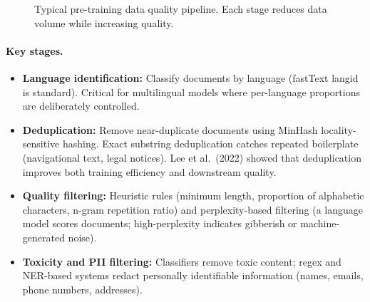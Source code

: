 \begin{figure}[H]
\centering
{}
\caption{Typical pre-training data quality pipeline.  Each stage reduces data volume
while increasing quality.}
\label{fig:data-pipeline}
\end{figure}

\paragraph{Key stages.}
\begin{itemize}
    \item \textbf{Language identification:} Classify documents by language
          (fastText langid is standard).  Critical for multilingual models
          where per-language proportions are deliberately controlled.
    \item \textbf{Deduplication:} Remove near-duplicate documents using
          MinHash locality-sensitive hashing.  Exact substring deduplication
          catches repeated boilerplate (navigational text, legal notices).
          Lee et al.\ (2022) showed that deduplication improves both training
          efficiency and downstream quality.
    \item \textbf{Quality filtering:} Heuristic rules (minimum length,
          proportion of alphabetic characters, n-gram repetition ratio) and
          perplexity-based filtering (a language model scores documents;
          high-perplexity indicates gibberish or machine-generated noise).
    \item \textbf{Toxicity and PII filtering:} Classifiers remove toxic content;
          regex and NER-based systems redact personally identifiable information
          (names, emails, phone numbers, addresses).
\end{itemize}

